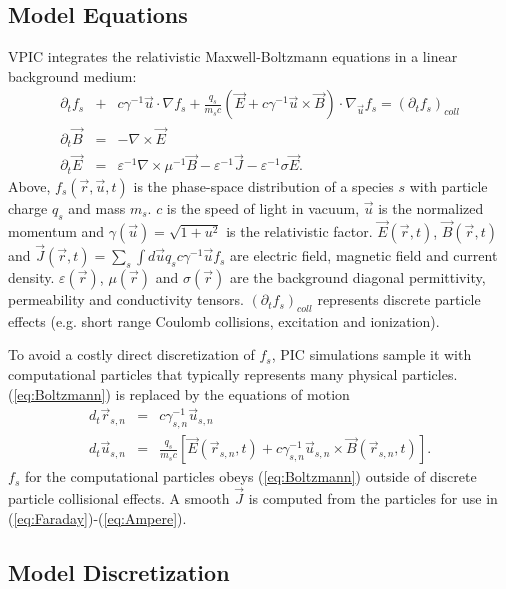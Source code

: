 \documentclass[10pt]{article}
\newcommand{\eps}{\varepsilon}
\newcommand{\vecr}{\vec{r}}
\newcommand{\vecu}{\vec{u}}
\newcommand{\vecJ}{\vec{J}}
\newcommand{\vecE}{\vec{E}}
\newcommand{\vecB}{\vec{B}}
\newcommand{\Deriv}[2]{d_{#2}#1}
\newcommand{\PDeriv}[2]{\partial_{#2}#1}
\newcommand{\DotP}[2]{#1 \cdot #2}
\newcommand{\CrossP}[2]{#1 \times #2}
\newcommand{\Grad}[1]{\nabla #1}
\newcommand{\Curl}[1]{\nabla \times #1}
\newcommand{\Gradu}[1]{\nabla_{\vecu} #1}
\newcommand{\eq}[1]{(\ref{eq:#1})}
\begin{document}
\subsection{Model Equations}

VPIC integrates the relativistic Maxwell-Boltzmann equations in a
linear background medium:
\begin{eqnarray}
\PDeriv{f_s}{t} &+& 
\DotP{c\gamma^{-1}\vecu}{\Grad{f_s}} +
\DotP{\frac{q_s}{m_s c}\left(\vecE+\CrossP{c\gamma^{-1}\vecu}{\vecB}\right)}
{\Gradu{f_s}} = \left(\PDeriv{f_s}{t}\right)_{coll} \label{eq:Boltzmann}\\
\PDeriv{\vecB}{t} &=& -\Curl{\vecE} \label{eq:Faraday}\\
\PDeriv{\vecE}{t} &=&
\eps^{-1}\Curl{\mu^{-1}\vecB} - \eps^{-1}\vecJ - \eps^{-1}\sigma\vecE
\label{eq:Ampere}
.
\end{eqnarray}
Above, $f_s\left(\vecr,\vecu,t\right)$ is the phase-space distribution
of a species $s$ with particle charge $q_s$ and mass $m_s$.  $c$ is
the speed of light in vacuum, $\vecu$ is the normalized momentum and
$\gamma\left(\vecu\right) = \sqrt{1 + u^2}$ is the relativistic
factor.  $\vecE\left(\vecr,t\right)$, $\vecB\left(\vecr,t\right)$ and
$\vecJ\left(\vecr,t\right) = \sum_s \int d\vecu q_s c\gamma^{-1}\vecu
f_s$ are electric field, magnetic field and current density.
$\eps\left(\vecr\right)$, $\mu\left(\vecr\right)$ and
$\sigma\left(\vecr\right)$ are the background diagonal permittivity,
permeability and conductivity tensors.
$\left(\PDeriv{f_s}{t}\right)_{coll}$ represents discrete particle
effects (e.g. short range Coulomb collisions, excitation and
ionization).

To avoid a costly direct discretization of $f_s$, PIC simulations
sample it with computational particles that typically represents many
physical particles.  \eq{Boltzmann} is replaced by the equations of
motion
\begin{eqnarray}
\Deriv{\vecr_{s,n}}{t} &=& c \gamma_{s,n}^{-1} \vecu_{s,n} \label{eq:Position}\\
\Deriv{\vecu_{s,n}}{t} &=& \frac{q_s}{m_s c} \left[
\vecE\left(\vecr_{s,n},t\right) +
\CrossP{c\gamma_{s,n}^{-1}\vecu_{s,n}}{\vecB\left(\vecr_{s,n},t\right)}
\right] \label{eq:Momentum}
.
\end{eqnarray}
$f_s$ for the computational particles obeys \eq{Boltzmann} outside of
discrete particle collisional effects.  A smooth $\vecJ$ is computed
from the particles for use in \eq{Faraday}-\eq{Ampere}.

\subsection{Model Discretization}
\end{document}
